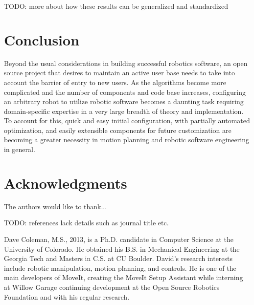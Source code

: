 \documentclass[10pt,journal,compsoc]{joser1}
\begin{document}
{TODO: more about how these results can be generalized and standardized

\section{Conclusion}
\label{sec::conclusion}

Beyond the usual considerations in building successful robotics software, an open source project that desires to maintain an active user base needs to take into account the barrier of entry to new users. As the algorithms become more complicated and the number of components and code base increases, configuring an arbitrary robot to utilize robotic software becomes a daunting task requiring domain-specific expertise in a very large breadth of theory and implementation. To account for this, quick and easy initial configuration, with partially automated optimization, and easily extensible components for future customization are becoming a greater necessity in motion planning and robotic software engineering in general. 

\section*{Acknowledgments}
The authors would like to thank...

TODO: references lack details such as journal title etc. 





\begin{IEEEbiography}[{coleman}]{Dave Coleman}, M.S., 2013, is a Ph.D. candidate in Computer Science at the University of Colorado. He obtained his B.S. in Mechanical Engineering at the Georgia Tech and Masters in C.S. at CU Boulder. David's research interests include robotic manipulation, motion planning, and controls. He is one of the main developers of MoveIt, creating the MoveIt Setup Assistant while interning at Willow Garage continuing development at the Open Source Robotics Foundation and with his regular research.
\end{IEEEbiography}

}
\end{document}
